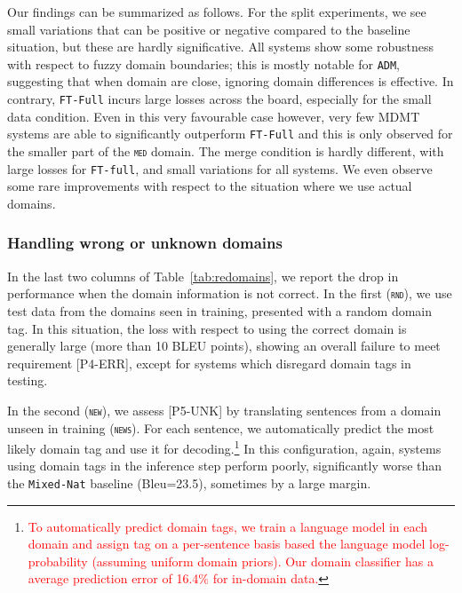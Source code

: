 \documentclass[11pt,a4paper]{article}
\newcommand{\fyDone}[1]{\done[FY]\Todo[FY:]{\textcolor{orange}{#1}}}
\newcommand{\revision}[1]{\textcolor{red}{#1}}
\newcommand{\domain}[1]{\texttt{\textsc{#1}}}
\newcommand{\system}[1]{\texttt{{#1}}}
\begin{document}
Our findings can be summarized as follows. For the split experiments, we see small variations that can be positive or negative compared to the baseline situation, but these are hardly significative. All systems show some robustness with respect to fuzzy domain boundaries; this is mostly notable for \system{ADM}, suggesting that when domain are close, ignoring domain differences is effective. In contrary, \system{FT-Full} incurs large losses across the board, especially for the small data condition. Even in this very favourable case however, very few MDMT systems are able to significantly outperform \system{FT-Full} and this is only observed for the smaller part of the \domain{med} domain. The merge condition is hardly different, with large losses for \system{FT-full}, and small variations for all systems. We even observe some rare improvements with respect to the situation where we use actual domains.\fyDone{More comments ?}

\subsubsection{Handling wrong or unknown domains \label{sssec:unknowns}}

\fyDone{Numbers for the rand domain analysis}In the last two columns of Table~\ref{tab:redomains}, we report the drop in performance when the domain information is not correct. In the first (\domain{rnd}), we use test data from the domains seen in training, presented with a random domain tag\fyDone{all configs use the same tag or is randomization is run for each config}. In this situation, the loss with respect to using the correct domain is generally large (more than 10 BLEU points), showing an overall failure to meet requirement [P4-ERR], except for systems which disregard domain tags in testing. \fyDone{Comments?}

In the second (\domain{new}), we assess [P5-UNK] by translating sentences from a domain unseen in training (\domain{news}).\fyDone{i would use RND / UNK rather than OLD / NEW} For each sentence, we automatically predict the most likely domain tag and use it for decoding.\footnote{\revision{To automatically predict domain tags, we train a language model in each domain and assign tag on a per-sentence basis based the language model log-probability (assuming uniform domain priors). Our domain classifier has a average prediction error of 16.4\% for in-domain data.}}
In this configuration, again, systems using domain tags in the inference step perform poorly, significantly worse than the \system{Mixed-Nat} baseline (Bleu=23.5)\fyDone{performance drop is now measured against Mixed-nat (leave it clearer?)}, sometimes by a large margin.\fyDone{Check significance, To be completed}
\end{document}

